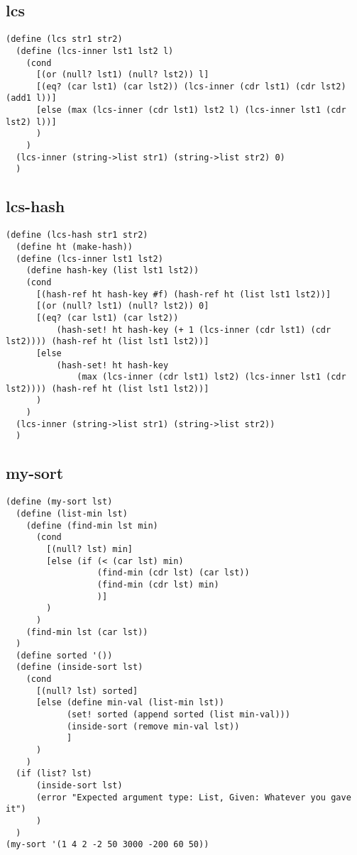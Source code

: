 \subsection{lcs}%
\label{sub:lcs}

\begin{minipage}{\linewidth}
\begin{lstlisting}
(define (lcs str1 str2)
  (define (lcs-inner lst1 lst2 l)
    (cond
      [(or (null? lst1) (null? lst2)) l]
      [(eq? (car lst1) (car lst2)) (lcs-inner (cdr lst1) (cdr lst2) (add1 l))]
      [else (max (lcs-inner (cdr lst1) lst2 l) (lcs-inner lst1 (cdr lst2) l))]
      )
    )
  (lcs-inner (string->list str1) (string->list str2) 0)
  )
\end{lstlisting}
\end{minipage}

\begin{minipage}{\linewidth}
\subsection{lcs-hash}%
\label{sub:lcs_hash}

\begin{lstlisting}
(define (lcs-hash str1 str2)
  (define ht (make-hash))
  (define (lcs-inner lst1 lst2)
    (define hash-key (list lst1 lst2))
    (cond
      [(hash-ref ht hash-key #f) (hash-ref ht (list lst1 lst2))]
      [(or (null? lst1) (null? lst2)) 0]
      [(eq? (car lst1) (car lst2))
          (hash-set! ht hash-key (+ 1 (lcs-inner (cdr lst1) (cdr lst2)))) (hash-ref ht (list lst1 lst2))]
      [else
          (hash-set! ht hash-key
              (max (lcs-inner (cdr lst1) lst2) (lcs-inner lst1 (cdr lst2)))) (hash-ref ht (list lst1 lst2))]
      )
    )
  (lcs-inner (string->list str1) (string->list str2))
  )
\end{lstlisting}
\end{minipage}

\newpage

\subsection{my-sort}%
\label{sub:my_sort}

\begin{lstlisting}
(define (my-sort lst)
  (define (list-min lst)
    (define (find-min lst min)
      (cond
        [(null? lst) min]
        [else (if (< (car lst) min)
                  (find-min (cdr lst) (car lst))
                  (find-min (cdr lst) min)
                  )]
        )
      )
    (find-min lst (car lst))
  )
  (define sorted '())
  (define (inside-sort lst)
    (cond
      [(null? lst) sorted]
      [else (define min-val (list-min lst))
            (set! sorted (append sorted (list min-val)))
            (inside-sort (remove min-val lst))
            ]
      )
    )
  (if (list? lst)
      (inside-sort lst)
      (error "Expected argument type: List, Given: Whatever you gave it")
      )
  )
(my-sort '(1 4 2 -2 50 3000 -200 60 50))
\end{lstlisting}

